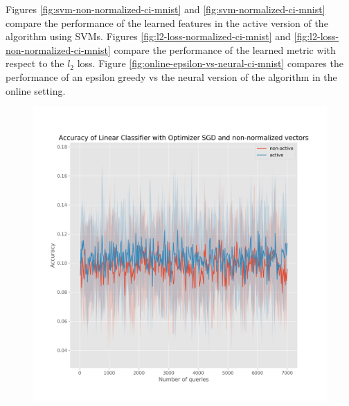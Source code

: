 \documentclass{article}
\begin{document}
Figures \ref{fig:svm-non-normalized-ci-mnist} and \ref{fig:svm-normalized-ci-mnist} compare the performance of the learned features in the active version of the algorithm using SVMs.
Figures \ref{fig:l2-loss-normalized-ci-mnist} and \ref{fig:l2-loss-non-normalized-ci-mnist} compare the performance of the learned metric with respect to the $l_2$ loss.
Figure \ref{fig:online-epsilon-vs-neural-ci-mnist} compares the performance of an epsilon greedy vs the neural version of the algorithm in the online setting.



\begin{figure}[h]
  \centering
  \begin{minipage}{.45\textwidth}
    \centering
    \includegraphics[width=\linewidth]{active-vs-base-mnist-linear-loss-SGD-non-normalized-ci}
  \end{minipage}%
  \begin{minipage}{.45\textwidth}
    \centering

\end{minipage}
\end{figure}
\end{document}
